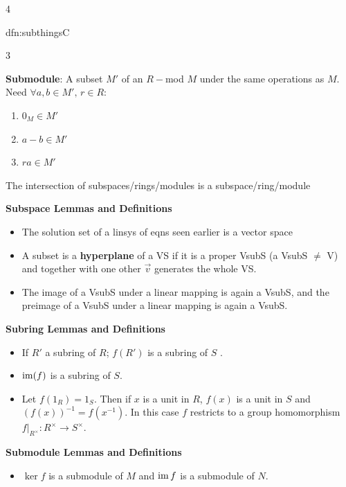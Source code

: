 \documentclass[landscape, 8pt]{extarticle}
\begin{document}
\begin{multicols*}{4}
\begin{mdfn}{dfn:subthings}{C}
{\begin{multicols}{3}
				\columnbreak
				
				\vspace*{-7ex}
				
				\textbf{Submodule}: A subset $M'$ of an $R-$mod $M$ under the same operations as $M$. Need $\forall a, b\in M',\,r\in R$:
				\begin{enumerate}
					\item $0_{M}\in M'$
					\item $a - b \in M'$
					\item $ra\in M'$
				\end{enumerate}
			\end{multicols}
			\setlength{\columnseprule}{0pt}
		}
			
			\vspace*{-5ex}
			
			The intersection of subspaces/rings/modules is a subspace/ring/module
			
			\textbf{Subspace Lemmas and Definitions}
			\begin{itemize}
				\item The solution set of a linsys of eqns seen earlier is a vector space
				\item A subset is a \textbf{hyperplane} of a VS if it is a proper VsubS (a VsubS $\ne$ V) and together with one other $\vec{v}$ generates the whole VS.
				\item The image of a VsubS under a linear mapping is again a VsubS, and the preimage of a VsubS under a linear mapping is again a VsubS.
			\end{itemize}
			
			\textbf{Subring Lemmas and Definitions}
			\begin{itemize}
				\item If $R'$ a subring of $R$; $f(R')$ is a subring of $S$ .
				\item $\operatorname{im}(f)$ is a subring of $S$.
				\item Let $f(1_R) = 1_S$. Then if $x$ is a unit in $R$, $f(x)$ is a unit in $S$ and $(f(x))^{-1} = f(x^{-1})$. In this case $f$ restricts to a group homomorphism $\left.f\right|_{R^\times} : R^\times \to S^\times$.
			\end{itemize}
			
			\textbf{Submodule Lemmas and Definitions}
				\begin{itemize}
					\item $\ker f$ is a submodule of $M$ and $\operatorname{im} f$ is a submodule of $N$.
				\end{itemize}
				

\end{mdfn}
\end{multicols*}
\end{document}
